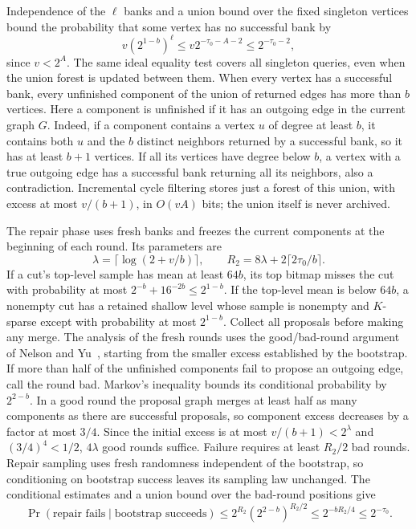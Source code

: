 \documentclass[11pt,letterpaper]{article}
\numberwithin{equation}{section}
\begin{document}
Independence of the $\ell$ banks and a union bound over the fixed singleton vertices bound the probability that some vertex has no successful bank by
\[
 v(2^{1-b})^\ell\le v2^{-\tau_0-A-2}\le2^{-\tau_0-2},
\]
since $v<2^A$.
The same ideal equality test covers all singleton queries, even when the union forest is updated between them.
When every vertex has a successful bank, every unfinished component of the union of returned edges has more than $b$ vertices.
Here a component is unfinished if it has an outgoing edge in the current graph $G$.
Indeed, if a component contains a vertex $u$ of degree at least $b$, it contains both $u$ and the $b$ distinct neighbors returned by a successful bank, so it has at least $b+1$ vertices.
If all its vertices have degree below $b$, a vertex with a true outgoing edge has a successful bank returning all its neighbors, also a contradiction.
Incremental cycle filtering stores just a forest of this union, with excess at most $v/(b+1)$, in $O(vA)$ bits; the union itself is never archived.

The repair phase uses fresh banks and freezes the current components at the beginning of each round.
Its parameters are
\[
 \lambda=\lceil\log(2+v/b)\rceil,\qquad
 R_2=8\lambda+2\lceil2\tau_0/b\rceil.
\]
If a cut's top-level sample has mean at least $64b$, its top bitmap misses the cut with probability at most $2^{-b}+16^{-2b}\le2^{1-b}$.
If the top-level mean is below $64b$, a nonempty cut has a retained shallow level whose sample is nonempty and $K$-sparse except with probability at most $2^{1-b}$.
Collect all proposals before making any merge.
The analysis of the fresh rounds uses the good/bad-round argument of Nelson and Yu~\cite[Appendix~A]{NelsonYu2019}, starting from the smaller excess established by the bootstrap.
If more than half of the unfinished components fail to propose an outgoing edge, call the round bad.
Markov's inequality bounds its conditional probability by $2^{2-b}$.
In a good round the proposal graph merges at least half as many components as there are successful proposals, so component excess decreases by a factor at most $3/4$.
Since the initial excess is at most $v/(b+1)<2^\lambda$ and $(3/4)^4<1/2$, $4\lambda$ good rounds suffice.
Failure requires at least $R_2/2$ bad rounds.
Repair sampling uses fresh randomness independent of the bootstrap, so conditioning on bootstrap success leaves its sampling law unchanged.
The conditional estimates and a union bound over the bad-round positions give
\[
 \Pr(\text{repair fails}\mid\text{bootstrap succeeds})
 \le 2^{R_2}(2^{2-b})^{R_2/2}
 \le2^{-bR_2/4}\le2^{-\tau_0}.
\]
\end{document}
